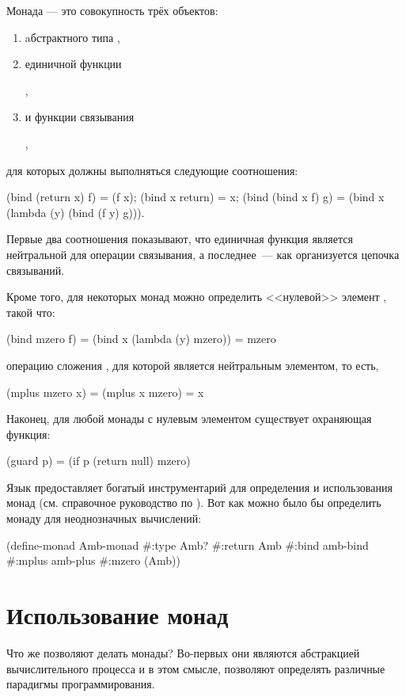 Монада --- это совокупность трёх объектов:
\begin{enumerate}
  \item aбстрактного типа ,
  \item единичной функции 
  \begin{center}
  ,
  \end{center}
  \item и функции связывания 
  \begin{center}
  ,
  \end{center}
\end{enumerate}
для которых должны выполняться следующие соотношения:
\begin{SchemeCode}[emph={f,x,y,g}]
  (bind (return x) f) = (f x);
  (bind x return) = x;
  (bind (bind x f) g) = (bind x (lambda (y) (bind (f y) g))).
\end{SchemeCode}
Первые два соотношения показывают, что единичная функция является нейтральной для операции связывания, а последнее~--- как организуется цепочка связываний.

Кроме того, для некоторых монад можно определить <<нулевой>> элемент , такой что:

\begin{SchemeCode}[emph={f,x,y}]
  (bind mzero f) = (bind x (lambda (y) mzero)) = mzero
\end{SchemeCode}
 операцию сложения , для которой  является нейтральным элементом, то есть,
\begin{SchemeCode}
  (mplus mzero x) = (mplus x mzero) = x
\end{SchemeCode}

Наконец, для любой монады с нулевым элементом существует охраняющая функция:

\begin{SchemeCode}[emph={p}]
  (guard p) = (if p (return null) mzero)
\end{SchemeCode}

Язык \Scheme предоставляет богатый инструментарий для определения и использования монад (см. справочное руководство по \Scheme). Вот как можно было бы определить монаду для неоднозначных вычислений:
\begin{SchemeCode}
(define-monad Amb-monad
  #:type Amb?
  #:return Amb
  #:bind amb-bind
  #:mplus amb-plus
  #:mzero (Amb))
\end{SchemeCode}

\section[2]{Использование монад}%
Что же позволяют делать монады? Во-первых они являются абстракцией вычислительного процесса и в этом смысле, позволяют определять различные парадигмы программирования. 


